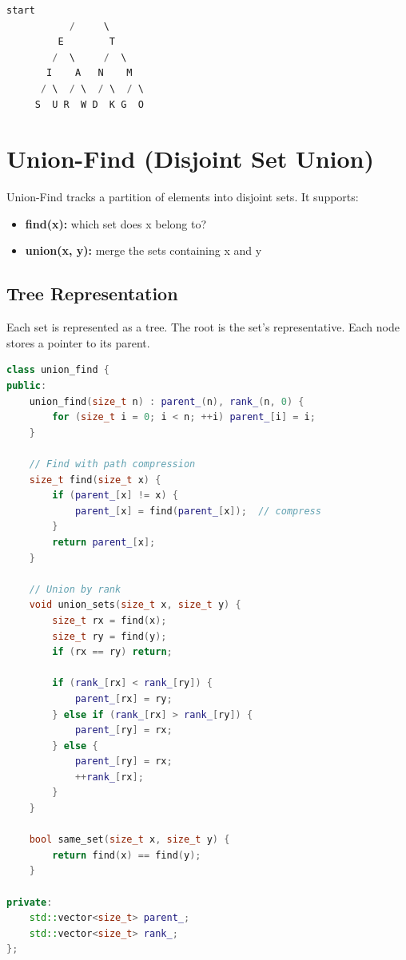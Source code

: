 \begin{lstlisting}[language=Java]
            start
           /     \
         E        T
        /  \     /  \
       I    A   N    M
      / \  / \  / \  / \
     S  U R  W D  K G  O
\end{lstlisting}

\section{Union-Find (Disjoint Set Union)}

Union-Find tracks a partition of elements into disjoint sets. It supports:
\begin{itemize}
\item \textbf{find(x):} which set does x belong to?
\item \textbf{union(x, y):} merge the sets containing x and y
\end{itemize}

\subsection{Tree Representation}

Each set is represented as a tree. The root is the set's representative. Each node stores a pointer to its parent.

\begin{lstlisting}[language=C++]
class union_find {
public:
    union_find(size_t n) : parent_(n), rank_(n, 0) {
        for (size_t i = 0; i < n; ++i) parent_[i] = i;
    }

    // Find with path compression
    size_t find(size_t x) {
        if (parent_[x] != x) {
            parent_[x] = find(parent_[x]);  // compress
        }
        return parent_[x];
    }

    // Union by rank
    void union_sets(size_t x, size_t y) {
        size_t rx = find(x);
        size_t ry = find(y);
        if (rx == ry) return;

        if (rank_[rx] < rank_[ry]) {
            parent_[rx] = ry;
        } else if (rank_[rx] > rank_[ry]) {
            parent_[ry] = rx;
        } else {
            parent_[ry] = rx;
            ++rank_[rx];
        }
    }

    bool same_set(size_t x, size_t y) {
        return find(x) == find(y);
    }

private:
    std::vector<size_t> parent_;
    std::vector<size_t> rank_;
};
\end{lstlisting}

